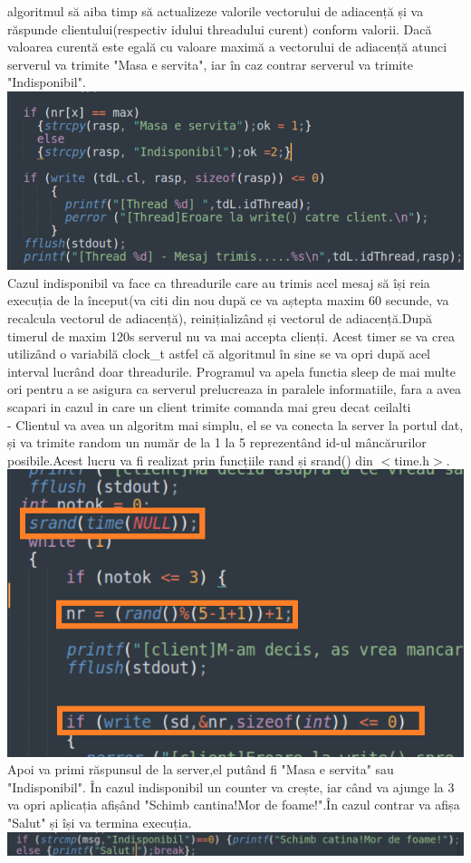 \documentclass{llncs}
\begin{document}
algoritmul să aiba timp să actualizeze valorile vectorului de adiacență și va răspunde clientului(respectiv idului threadului curent) conform valorii. Dacă valoarea curentă este egală cu valoare maximă a vectorului de adiacență  atunci serverul va trimite "Masa e servita", iar în caz contrar serverul va trimite "Indisponibil".\\ \includegraphics{cod3.png} \\Cazul indisponibil va face ca threadurile care au trimis acel mesaj să își reia execuția de la început(va citi din nou după ce va aștepta maxim 60 secunde, va recalcula vectorul de adiacență), reinițializând și vectorul de adiacență.După timerul de maxim 120s serverul nu va mai accepta clienți. Acest timer se va crea utilizând o variabilă clock\_t astfel că algoritmul în sine se va opri după acel interval lucrând doar threadurile. Programul va apela functia sleep de mai multe ori pentru a se asigura ca serverul prelucreaza in paralele informatiile, fara a avea scapari in cazul in care un client trimite comanda mai greu decat ceilalti\\
- Clientul va avea un algoritm mai simplu, el se va conecta la server la portul dat, și va trimite random un număr de la 1 la 5 reprezentând id-ul mâncărurilor posibile.Acest lucru va fi realizat prin funcțiile rand și srand() din $<$time.h$>$.\\ \includegraphics{cod4.png}\\ Apoi va primi răspunsul de la server,el putând fi "Masa e servita" sau "Indisponibil". În cazul indisponibil un counter va crește, iar când va ajunge la 3 va opri aplicația afișând  "Schimb cantina!Mor de foame!".În cazul contrar va afișa "Salut" și își va termina execuția.\\ \includegraphics{cod5.png}\\
\end{document}
